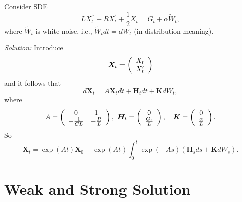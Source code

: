 \begin{exam}
    Consider SDE
    \begin{equation*}
        LX_t^{\prime\prime} + RX_t^\prime + \frac{1}{2}X_t = G_t + \alpha \tilde{W}_t,
    \end{equation*}
    where $\tilde{W}_t$ is white noise, i.e., $\tilde{W}_t dt = dW_t$ (in distribution meaning).

    \noindent \emph{Solution:} Introduce
    \begin{equation*}
         \bm{X}_t = \left(
            \begin{array}{c}
                X_t \\
                X_t^\prime
            \end{array}
        \right)
    \end{equation*}
    and it follows that
    \begin{equation*}
        d\bm{X}_t = A\bm{X}_t dt + \bm{H}_t dt + \bm{K} dW_t,
    \end{equation*}
    where
    \begin{equation*}
        A=\left(\begin{array}{cc}
            0 & 1 \\
            -\frac{1}{C L} & -\frac{R}{L}
        \end{array}\right),~\bm{H}_t = \left(
            \begin{array}{c}
                0 \\
                \frac{G_t}{L}
            \end{array}
        \right),\quad \bm{K} = \left(
            \begin{array}{c}
                0 \\
                \frac{\alpha}{L}
            \end{array}
        \right).
    \end{equation*}
    So
    \begin{equation*}
        \bm{X}_t=\exp (A t) \bm{X}_0+\exp (A t) \int_0^t \exp (-A s)\left(\bm{H}_s d s+\bm{K} d W_s\right).
    \end{equation*}
\end{exam}

\section{Weak and Strong Solution}

